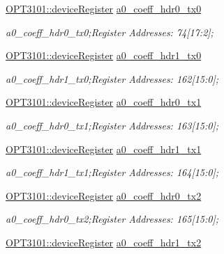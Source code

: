 \begin{DoxyCompactItemize}
\mbox{\hyperlink{class_o_p_t3101_1_1device_register}{O\+P\+T3101\+::device\+Register}} \mbox{\hyperlink{class_o_p_t3101_1_1registers_ac9bd91107a6b02c8a5eef960a5d72e2c}{a0\+\_\+coeff\+\_\+hdr0\+\_\+tx0}}
\begin{DoxyCompactList}\small\item\em a0\+\_\+coeff\+\_\+hdr0\+\_\+tx0;Register Addresses\+: 74\mbox{[}17\+:2\mbox{]}; \end{DoxyCompactList}\item 
\mbox{\hyperlink{class_o_p_t3101_1_1device_register}{O\+P\+T3101\+::device\+Register}} \mbox{\hyperlink{class_o_p_t3101_1_1registers_ac8f0a935f80bb0dc046857f60a7fc516}{a0\+\_\+coeff\+\_\+hdr1\+\_\+tx0}}
\begin{DoxyCompactList}\small\item\em a0\+\_\+coeff\+\_\+hdr1\+\_\+tx0;Register Addresses\+: 162\mbox{[}15\+:0\mbox{]}; \end{DoxyCompactList}\item 
\mbox{\hyperlink{class_o_p_t3101_1_1device_register}{O\+P\+T3101\+::device\+Register}} \mbox{\hyperlink{class_o_p_t3101_1_1registers_a733f21a2ae70f6d7f9d75c0c8c32c46d}{a0\+\_\+coeff\+\_\+hdr0\+\_\+tx1}}
\begin{DoxyCompactList}\small\item\em a0\+\_\+coeff\+\_\+hdr0\+\_\+tx1;Register Addresses\+: 163\mbox{[}15\+:0\mbox{]}; \end{DoxyCompactList}\item 
\mbox{\hyperlink{class_o_p_t3101_1_1device_register}{O\+P\+T3101\+::device\+Register}} \mbox{\hyperlink{class_o_p_t3101_1_1registers_a49aa0acbf16b96f8ce10641c088c89fa}{a0\+\_\+coeff\+\_\+hdr1\+\_\+tx1}}
\begin{DoxyCompactList}\small\item\em a0\+\_\+coeff\+\_\+hdr1\+\_\+tx1;Register Addresses\+: 164\mbox{[}15\+:0\mbox{]}; \end{DoxyCompactList}\item 
\mbox{\hyperlink{class_o_p_t3101_1_1device_register}{O\+P\+T3101\+::device\+Register}} \mbox{\hyperlink{class_o_p_t3101_1_1registers_abc01841339867911f94e68223a50b6f3}{a0\+\_\+coeff\+\_\+hdr0\+\_\+tx2}}
\begin{DoxyCompactList}\small\item\em a0\+\_\+coeff\+\_\+hdr0\+\_\+tx2;Register Addresses\+: 165\mbox{[}15\+:0\mbox{]}; \end{DoxyCompactList}\item 
\mbox{\hyperlink{class_o_p_t3101_1_1device_register}{O\+P\+T3101\+::device\+Register}} \mbox{\hyperlink{class_o_p_t3101_1_1registers_abbec983e74f5790b541e49432c9e5765}{a0\+\_\+coeff\+\_\+hdr1\+\_\+tx2}}

\end{DoxyCompactItemize}
